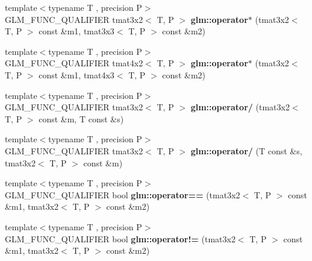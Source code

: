 \begin{DoxyCompactItemize}
\item 
\hypertarget{namespaceglm_aee7ea900a08465c9c1817f53fcbcf7ff}{{\footnotesize template$<$typename T , precision P$>$ }\\G\-L\-M\-\_\-\-F\-U\-N\-C\-\_\-\-Q\-U\-A\-L\-I\-F\-I\-E\-R tmat3x2$<$ T, P $>$ {\bfseries glm\-::operator$\ast$} (tmat3x2$<$ T, P $>$ const \&m1, tmat3x3$<$ T, P $>$ const \&m2)}\label{namespaceglm_aee7ea900a08465c9c1817f53fcbcf7ff}

\item 
\hypertarget{namespaceglm_aa2507681a80e35a140d713d4f82a015f}{{\footnotesize template$<$typename T , precision P$>$ }\\G\-L\-M\-\_\-\-F\-U\-N\-C\-\_\-\-Q\-U\-A\-L\-I\-F\-I\-E\-R tmat4x2$<$ T, P $>$ {\bfseries glm\-::operator$\ast$} (tmat3x2$<$ T, P $>$ const \&m1, tmat4x3$<$ T, P $>$ const \&m2)}\label{namespaceglm_aa2507681a80e35a140d713d4f82a015f}

\item 
\hypertarget{namespaceglm_ae2526344e7b366a2cabb1b48daba961e}{{\footnotesize template$<$typename T , precision P$>$ }\\G\-L\-M\-\_\-\-F\-U\-N\-C\-\_\-\-Q\-U\-A\-L\-I\-F\-I\-E\-R tmat3x2$<$ T, P $>$ {\bfseries glm\-::operator/} (tmat3x2$<$ T, P $>$ const \&m, T const \&s)}\label{namespaceglm_ae2526344e7b366a2cabb1b48daba961e}

\item 
\hypertarget{namespaceglm_a47965b2cdab0ed5c725e0d469c5e6865}{{\footnotesize template$<$typename T , precision P$>$ }\\G\-L\-M\-\_\-\-F\-U\-N\-C\-\_\-\-Q\-U\-A\-L\-I\-F\-I\-E\-R tmat3x2$<$ T, P $>$ {\bfseries glm\-::operator/} (T const \&s, tmat3x2$<$ T, P $>$ const \&m)}\label{namespaceglm_a47965b2cdab0ed5c725e0d469c5e6865}

\item 
\hypertarget{namespaceglm_af31e44ac30f1ebf93cc4324d0cde3050}{{\footnotesize template$<$typename T , precision P$>$ }\\G\-L\-M\-\_\-\-F\-U\-N\-C\-\_\-\-Q\-U\-A\-L\-I\-F\-I\-E\-R bool {\bfseries glm\-::operator==} (tmat3x2$<$ T, P $>$ const \&m1, tmat3x2$<$ T, P $>$ const \&m2)}\label{namespaceglm_af31e44ac30f1ebf93cc4324d0cde3050}

\item 
\hypertarget{namespaceglm_ab6d7d37966e4c81709adf07b0fd9a9d0}{{\footnotesize template$<$typename T , precision P$>$ }\\G\-L\-M\-\_\-\-F\-U\-N\-C\-\_\-\-Q\-U\-A\-L\-I\-F\-I\-E\-R bool {\bfseries glm\-::operator!=} (tmat3x2$<$ T, P $>$ const \&m1, tmat3x2$<$ T, P $>$ const \&m2)}\label{namespaceglm_ab6d7d37966e4c81709adf07b0fd9a9d0}

\end{DoxyCompactItemize}



